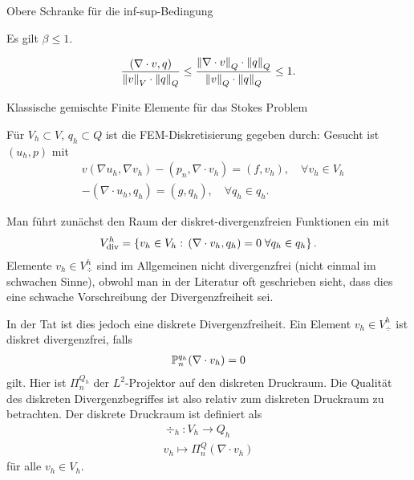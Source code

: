 \begin{lemma}
  Obere Schranke für die inf-sup-Bedingung

Es gilt $\beta \leq 1$. 
\end{lemma}
\begin{beweis}
  \begin{align*}
    \frac{(\nabla \cdot v, q)}{\nnorm v_{V} \cdot \nnorm q_{Q}} \leq \frac{\nnorm{\nabla \cdot v}_{Q} \cdot \nnorm q_{Q}}{\nnorm{ v}_{Q} \cdot \nnorm q_{Q}} \leq 1. 
  \end{align*}
\end{beweis}
\begin{definition}
  Klassische  gemischte Finite Elemente für das Stokes Problem

Für $V_{h} \subset V$, $q_{h} \subset Q$ ist die FEM-Diskretisierung gegeben durch: Gesucht ist $(u_{h}, p)$ mit 
\begin{align}\label{eq:disc}
&  v(\nabla u_{h}, \nabla v_{h}) - (p_{n}, \nabla \cdot v_{h}) = (f, v_{h}), \quad \forall v_{h} \in V_{h}\\
& - (\nabla \cdot u_{h}, q_{h}) = (g, q_{h}), \quad \forall q_{h} \in q_{h}. 
\end{align}
\end{definition}
\begin{bemerkung}
  Man führt zunächst den Raum der diskret-divergenzfreien Funktionen ein mit
  \begin{align*}
    V_{\div}^{h} = \set{v_{h} \in V_{h}: \, (\nabla\cdot v_{h}, q_{h}) = 0 \; \forall q_{h} \in q_{h}}. 
  \end{align*}
Elemente $v_{h} \in V_{\div}^{h}$ sind im Allgemeinen nicht divergenzfrei (nicht einmal im schwachen Sinne), obwohl man in der Literatur oft geschrieben sieht, dass dies eine schwache Vorschreibung der Divergenzfreiheit sei. 

In der Tat ist dies jedoch eine diskrete Divergenzfreiheit. Ein Element $v_{h} \in V_{\div}^{h}$ ist diskret divergenzfrei, falls
\begin{align*}
  \P_{n}^{q_{h}}(\nabla \cdot v_{h}) = 0
\end{align*}
gilt. Hier ist $\Pi_{n}^{Q_{h}}$ der $L^{2}$-Projektor auf den diskreten Druckraum. 
Die Qualität des diskreten Divergenzbegriffes ist also relativ zum diskreten Druckraum zu betrachten. Der diskrete Druckraum ist definiert als
\begin{align*}
  \div_{h} : V_{h} \to Q_{h}\\
v_{h} \mapsto \Pi_{n}^{Q} (\nabla \cdot v_{h})
\end{align*}
für alle $v_{h} \in V_{h}$. 
\end{bemerkung}

